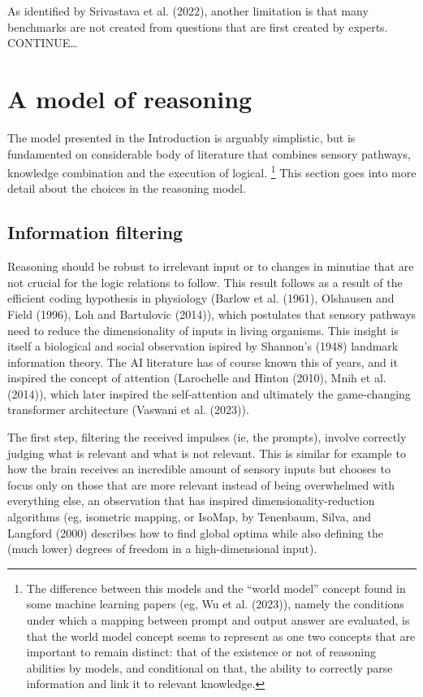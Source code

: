 \documentclass[
]{article}
\theoremstyle{plain}
\theoremstyle{definition}
\theoremstyle{remark}
\begin{document}
As identified by Srivastava et al. (2022), another limitation is that
many benchmarks are not created from questions that are first created by
experts. CONTINUE\ldots{}

\section{A model of reasoning}\label{a-model-of-reasoning}

The model presented in the Introduction is arguably simplistic, but is
fundamented on considerable body of literature that combines sensory
pathways, knowledge combination and the execution of logical.
\footnote{The difference between this models and the ``world model''
  concept found in some machine learning papers (eg, Wu et al. (2023)),
  namely the conditions under which a mapping between prompt and output
  answer are evaluated, is that the world model concept seems to
  represent as one two concepts that are important to remain distinct:
  that of the existence or not of reasoning abilities by models, and
  conditional on that, the ability to correctly parse information and
  link it to relevant knowledge.} This section goes into more detail
about the choices in the reasoning model.

\subsection{Information filtering}\label{information-filtering}

Reasoning should be robust to irrelevant input or to changes in minutiae
that are not crucial for the logic relations to follow. This result
follows as a result of the efficient coding hypothesis in physiology
(Barlow et al. (1961), Olshausen and Field (1996), Loh and Bartulovic
(2014)), which postulates that sensory pathways need to reduce the
dimensionality of inputs in living organisms. This insight is itself a
biological and social observation ispired by Shannon's (1948) landmark
information theory. The AI literature has of course known this of years,
and it inspired the concept of attention (Larochelle and Hinton (2010),
Mnih et al. (2014)), which later inspired the self-attention and
ultimately the game-changing transformer architecture (Vaswani et al.
(2023)).

The first step, filtering the received impulses (ie, the prompts),
involve correctly judging what is relevant and what is not relevant.
This is similar for example to how the brain receives an incredible
amount of sensory inputs but chooses to focus only on those that are
more relevant instead of being overwhelmed with everything else, an
observation that has inspired dimensionality-reduction algorithms (eg,
isometric mapping, or IsoMap, by Tenenbaum, Silva, and Langford (2000)
describes how to find global optima while also defining the (much lower)
degrees of freedom in a high-dimensional input).
\end{document}
